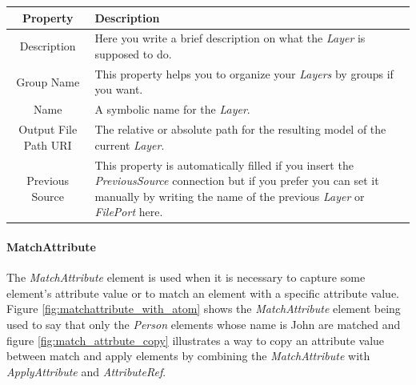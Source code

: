 \begin{center}
  \begin{tabular}{ | c | p{\paragraphsize} | }
    \hline
    \textbf{Property} & \textbf{Description} \\ \hline
    Description & Here you write a brief description on what the \emph{Layer}
  is supposed to do.  \\ \hline
    Group Name & This property helps you to organize your \emph{Layers} by
  groups if you want. \\ \hline
    Name & A symbolic name for the \emph{Layer}. \\ \hline
    Output File Path URI & The relative or absolute path for the resulting
  model of the current \emph{Layer}. \\ \hline
    Previous Source & This property is automatically filled if you insert the
  \emph{PreviousSource} connection but if you prefer you can set it manually by
  writing the name of the previous \emph{Layer} or \emph{FilePort} here. \\ \hline
  \end{tabular}
\end{center}

\paragraph{MatchAttribute}

The \emph{MatchAttribute} element is used when it is necessary to capture some
element's attribute value or to match an element with a specific attribute
value. Figure \ref{fig:matchattribute_with_atom} shows the \emph{MatchAttribute}
element being used to say that only the \emph{Person} elements whose name is
John are matched and figure \ref{fig:match_attrbute_copy} illustrates a way to
copy an attribute value between match and apply elements by combining the
\emph{MatchAttribute} with \emph{ApplyAttribute} and \emph{AttributeRef}.


